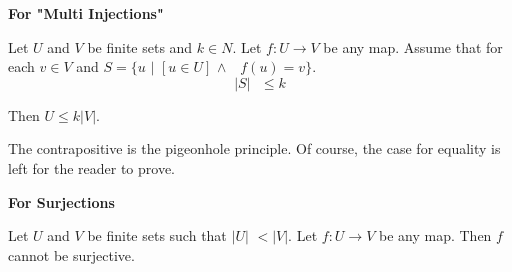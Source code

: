 \documentclass{article}
\begin{document}
\bigskip 

\textbf{For "Multi Injections"}

Let $U$ and $V$ be finite sets and $k\in N$. Let  $f:U\rightarrow V$ be any
map. Assume that for each $v\in V$ and $S=\{u$ $|$ $[u\in U]$ $\wedge $\ \ $%
f(u)=v\}$.%
\begin{equation*}
|S|\text{ }\leq k
\end{equation*}

Then $U\leq k|V|$.

\bigskip 

The contrapositive is the pigeonhole principle. Of course, the case for
equality is left for the reader to prove.

\bigskip 

\textbf{For Surjections}

Let $U$ and $V$ be finite sets such that $|U|$ $<|V|$. Let $f:U\rightarrow V$
be any map. Then  $f$ $\ $cannot be surjective.
\end{document}
